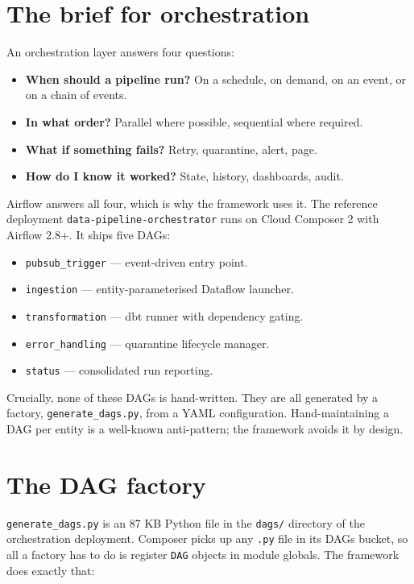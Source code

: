 \documentclass[
  11pt,
  british,
  oneside]{book}
\providecommand{\tightlist}{%
  \setlength{\itemsep}{0pt}\setlength{\parskip}{0pt}}
\begin{document}
\hypertarget{the-brief-for-orchestration}{%
\section{The brief for
orchestration}\label{the-brief-for-orchestration}}

An orchestration layer answers four questions:

\begin{itemize}
\tightlist
\item
  \textbf{When should a pipeline run?} On a schedule, on demand, on an
  event, or on a chain of events.
\item
  \textbf{In what order?} Parallel where possible, sequential where
  required.
\item
  \textbf{What if something fails?} Retry, quarantine, alert, page.
\item
  \textbf{How do I know it worked?} State, history, dashboards, audit.
\end{itemize}

Airflow answers all four, which is why the framework uses it. The
reference deployment \texttt{data-pipeline-orchestrator} runs on Cloud
Composer 2 with Airflow 2.8+. It ships
five DAGs:

\begin{itemize}
\tightlist
\item
  \texttt{pubsub\_trigger} --- event-driven entry point.
\item
  \texttt{ingestion} --- entity-parameterised Dataflow launcher.
\item
  \texttt{transformation} --- dbt runner with dependency gating.
\item
  \texttt{error\_handling} --- quarantine lifecycle manager.
\item
  \texttt{status} --- consolidated run reporting.
\end{itemize}

Crucially, none of these DAGs is hand-written. They are all generated by
a factory, \texttt{generate\_dags.py}, from a YAML configuration.
Hand-maintaining a DAG per entity is a well-known anti-pattern; the
framework avoids it by design.

\hypertarget{the-dag-factory}{%
\section{The DAG factory}\label{the-dag-factory}}

\texttt{generate\_dags.py}
is an 87 KB Python file in the \texttt{dags/} directory of the
orchestration deployment. Composer picks up any \texttt{.py} file in its
DAGs bucket, so all a factory has to do is register \texttt{DAG} objects
in module globals. The framework does exactly that:
\end{document}
